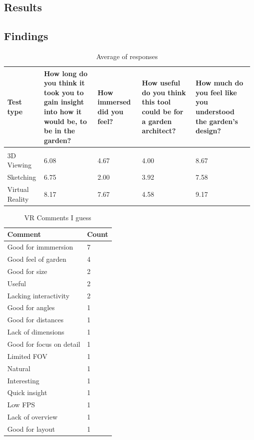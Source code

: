 \subsection{Results}

\subsection{Findings}
\begin{table}[H]
	\centering
	\caption{Average of responses}
	\label{my-label}
	\begin{tabular}{p{3cm}|p{3cm}|p{2cm}|p{3cm}|p{3cm}}
		Test type       & How long do you think it took you to gain insight into how it would be, to be in the garden? & How immersed did you feel? & How useful do you think this tool could be for a garden architect? & How much do you feel like you understood the garden's design? \\ \hline
		&&&&\\
		3D Viewing      & 6.08  & 4.67  & 4.00    & 8.67               \\
		Sketching       & 6.75    & 2.00    & 3.92      & 7.58            \\
		Virtual Reality & 8.17     & 7.67     & 4.58      & 9.17    
	\end{tabular}
\end{table}



\begin{table}[H]
	\centering
	\caption{VR Comments I guess}
	\label{my-label}
	\begin{tabular}{p{6cm}|p{1cm}}
		Comment & Count \\ \hline
		Good for immmersion & 7 \\
		Good feel of garden & 4 \\
		Good for size  & 2 \\
		Useful & 2 \\
		Lacking interactivity & 2 \\
		Good for angles & 1 \\
		Good for distances& 1 \\
		Lack of dimensions& 1 \\
		Good for focus on detail& 1 \\
		Limited FOV& 1 \\
		Natural& 1 \\
		Interesting& 1 \\
		Quick insight& 1 \\
		Low FPS& 1 \\
		Lack of overview& 1 \\
		Good for layout& 1 \\
		
	\end{tabular}
\end{table}
